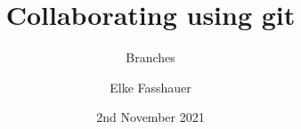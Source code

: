 \documentclass[xcolor=dvipsnames]{beamer}
\begin{document}
 

\title[]
{Collaborating using git}
\subtitle{Branches}
\author[E. Fasshauer]{Elke Fasshauer}
\date[2.11.21]{2nd November 2021}


\begin{frame}
\titlepage
\end{frame}




%







%
\end{document}

